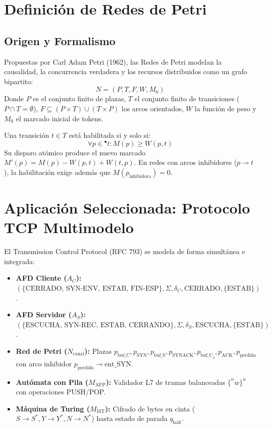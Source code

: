 \documentclass[12pt,letterpaper]{article}
\begin{document}
\section{Definición de Redes de Petri}

\subsection{Origen y Formalismo}
Propuestas por Carl Adam Petri (1962), las Redes de Petri modelan la causalidad, la concurrencia verdadera y los recursos distribuidos como un grafo bipartito:
\begin{equation}
N = (P, T, F, W, M_0)
\end{equation}
Donde $P$ es el conjunto finito de plazas, $T$ el conjunto finito de transiciones ($P \cap T = \emptyset$), $F \subseteq (P \times T) \cup (T \times P)$ los arcos orientados, $W$ la función de peso y $M_0$ el marcado inicial de tokens.

Una transición $t \in T$ está habilitada si y solo si:
\begin{equation}
\forall p \in {}^\bullet t : M(p) \ge W(p, t)
\end{equation}
Su disparo atómico produce el nuevo marcado $M'(p) = M(p) - W(p, t) + W(t, p)$. En redes con arcos inhibidores ($p \multimap t$), la habilitación exige además que $M(p_{\text{inhibidora}}) = 0$.

\section{Aplicación Seleccionada: Protocolo TCP Multimodelo}
El Transmission Control Protocol (RFC 793) se modela de forma simultánea e integrada:
\begin{itemize}
    \item \textbf{AFD Cliente ($A_C$):} $(\{ \text{CERRADO, SYN-ENV, ESTAB, FIN-ESP} \}, \Sigma, \delta_C, \text{CERRADO}, \{ \text{ESTAB} \})$.
    \item \textbf{AFD Servidor ($A_S$):} $(\{ \text{ESCUCHA, SYN-REC, ESTAB, CERRANDO} \}, \Sigma, \delta_S, \text{ESCUCHA}, \{ \text{ESTAB} \})$.
    \item \textbf{Red de Petri ($N_{\text{canal}}$):} Plazas $p_{\text{buf\_C}}, p_{\text{SYN}}, p_{\text{buf\_S}}, p_{\text{SYNACK}}, p_{\text{buf\_C}_2}, p_{\text{ACK}}, p_{\text{perdido}}$ con arco inhibidor $p_{\text{perdido}} \multimap \text{ent\_SYN}$.
    \item \textbf{Autómata con Pila ($M_{\text{AFP}}$):} Validador L7 de tramas balanceadas $\{^n w \}^n$ con operaciones PUSH/POP.
    \item \textbf{Máquina de Turing ($M_{\text{MT}}$):} Cifrado de bytes en cinta ($S \to S^*, Y \to Y^*, N \to N^*$) hasta estado de parada $q_{\text{halt}}$.
\end{itemize}
\end{document}
